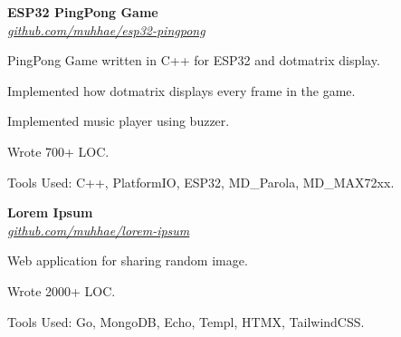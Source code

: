     \begin{twocolentry}{
    }
    \textbf{ESP32 PingPong Game}\\
    \textit{\href{https://github.com/muhhae/esp32-pingpong}{github.com/muhhae/esp32-pingpong}}
    \end{twocolentry}

    \vspace{0.10 cm}
    \begin{onecolentry}
        \begin{highlights}
            \item PingPong Game written in C++ for ESP32 and dotmatrix display.
            \item Implemented how dotmatrix displays every frame in the game.
            \item Implemented music player using buzzer.
            \item Wrote 700+ LOC.
            \item Tools Used: C++, PlatformIO, ESP32, MD\_Parola, MD\_MAX72xx.
        \end{highlights}
    \end{onecolentry}

    \vspace{0.2 cm}

    \begin{twocolentry}{
    }
    \textbf{Lorem Ipsum}\\
    \textit{\href{https://github.com/muhhae/lorem-ipsum}{github.com/muhhae/lorem-ipsum}}
    \end{twocolentry}

    \vspace{0.10 cm}
    \begin{onecolentry}
        \begin{highlights}
            \item Web application for sharing random image.
            \item Wrote 2000+ LOC.
            \item Tools Used: Go, MongoDB, Echo, Templ, HTMX, TailwindCSS.
        \end{highlights}
    \end{onecolentry}
